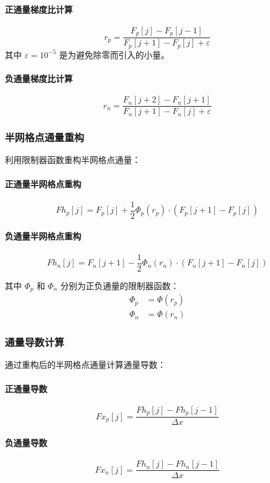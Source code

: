 \documentclass[12pt,a4paper]{article}
\begin{document}
\paragraph{正通量梯度比计算}
$$
r_p = \frac{F_p[j] - F_p[j-1]}{F_p[j+1] - F_p[j] + \varepsilon}
$$
其中 $\varepsilon = 10^{-5}$ 是为避免除零而引入的小量。

\paragraph{负通量梯度比计算}
$$
r_n = \frac{F_n[j+2] - F_n[j+1]}{F_n[j+1] - F_n[j] + \varepsilon}
$$

\subsubsection{半网格点通量重构}
利用限制器函数重构半网格点通量：

\paragraph{正通量半网格点重构}
$$
Fh_p[j] = F_p[j] + \frac{1}{2}\Phi_p(r_p) \cdot (F_p[j+1] - F_p[j])
$$

\paragraph{负通量半网格点重构}
$$
Fh_n[j] = F_n[j+1] - \frac{1}{2}\Phi_n(r_n) \cdot (F_n[j+1] - F_n[j])
$$

其中 $\Phi_p$ 和 $\Phi_n$ 分别为正负通量的限制器函数：
\begin{align*}
\Phi_p &= \Phi(r_p) \\
\Phi_n &= \Phi(r_n)
\end{align*}

\subsubsection{通量导数计算}
通过重构后的半网格点通量计算通量导数：

\paragraph{正通量导数}
$$
Fx_p[j] = \frac{Fh_p[j] - Fh_p[j-1]}{\Delta x}
$$

\paragraph{负通量导数}
$$
Fx_n[j] = \frac{Fh_n[j] - Fh_n[j-1]}{\Delta x}
$$
\end{document}
